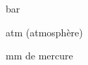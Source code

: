 

\begin{enonce}
bar
\end{enonce}



\begin{enonce}
atm (atmosphère)
\end{enonce}



\begin{enonce}
mm de mercure
\end{enonce}


\finEntrainement




\hauteurLargeurCadreReponse		{8mm}{2cm}
\initialisationEntrainement

